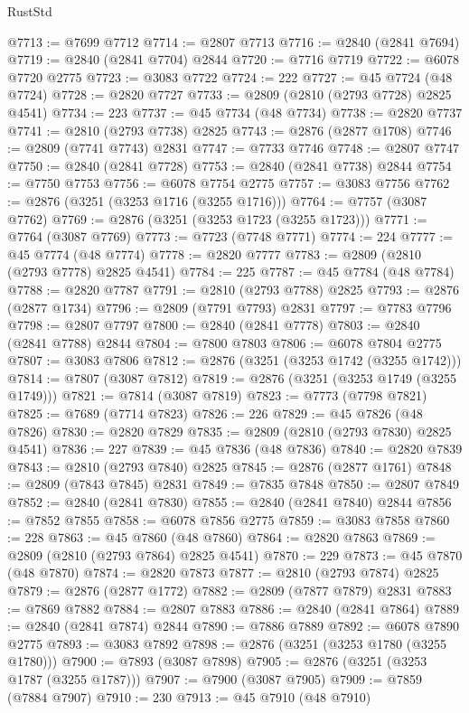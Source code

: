 \begin{lexlean}{RustStd}
\begin{coremodule}
@7713 := @7699 @7712
@7714 := @2807 @7713
@7716 := @2840 (@2841 @7694)
@7719 := @2840 (@2841 @7704) @2844
@7720 := @7716 @7719
@7722 := @6078 @7720 @2775
@7723 := @3083 @7722
@7724 := 222
@7727 := @45 @7724 (@48 @7724)
@7728 := @2820 @7727
@7733 := @2809 (@2810 (@2793 @7728) @2825 @4541)
@7734 := 223
@7737 := @45 @7734 (@48 @7734)
@7738 := @2820 @7737
@7741 := @2810 (@2793 @7738) @2825
@7743 := @2876 (@2877 @1708)
@7746 := @2809 (@7741 @7743) @2831
@7747 := @7733 @7746
@7748 := @2807 @7747
@7750 := @2840 (@2841 @7728)
@7753 := @2840 (@2841 @7738) @2844
@7754 := @7750 @7753
@7756 := @6078 @7754 @2775
@7757 := @3083 @7756
@7762 := @2876 (@3251 (@3253 @1716 (@3255 @1716)))
@7764 := @7757 (@3087 @7762)
@7769 := @2876 (@3251 (@3253 @1723 (@3255 @1723)))
@7771 := @7764 (@3087 @7769)
@7773 := @7723 (@7748 @7771)
@7774 := 224
@7777 := @45 @7774 (@48 @7774)
@7778 := @2820 @7777
@7783 := @2809 (@2810 (@2793 @7778) @2825 @4541)
@7784 := 225
@7787 := @45 @7784 (@48 @7784)
@7788 := @2820 @7787
@7791 := @2810 (@2793 @7788) @2825
@7793 := @2876 (@2877 @1734)
@7796 := @2809 (@7791 @7793) @2831
@7797 := @7783 @7796
@7798 := @2807 @7797
@7800 := @2840 (@2841 @7778)
@7803 := @2840 (@2841 @7788) @2844
@7804 := @7800 @7803
@7806 := @6078 @7804 @2775
@7807 := @3083 @7806
@7812 := @2876 (@3251 (@3253 @1742 (@3255 @1742)))
@7814 := @7807 (@3087 @7812)
@7819 := @2876 (@3251 (@3253 @1749 (@3255 @1749)))
@7821 := @7814 (@3087 @7819)
@7823 := @7773 (@7798 @7821)
@7825 := @7689 (@7714 @7823)
@7826 := 226
@7829 := @45 @7826 (@48 @7826)
@7830 := @2820 @7829
@7835 := @2809 (@2810 (@2793 @7830) @2825 @4541)
@7836 := 227
@7839 := @45 @7836 (@48 @7836)
@7840 := @2820 @7839
@7843 := @2810 (@2793 @7840) @2825
@7845 := @2876 (@2877 @1761)
@7848 := @2809 (@7843 @7845) @2831
@7849 := @7835 @7848
@7850 := @2807 @7849
@7852 := @2840 (@2841 @7830)
@7855 := @2840 (@2841 @7840) @2844
@7856 := @7852 @7855
@7858 := @6078 @7856 @2775
@7859 := @3083 @7858
@7860 := 228
@7863 := @45 @7860 (@48 @7860)
@7864 := @2820 @7863
@7869 := @2809 (@2810 (@2793 @7864) @2825 @4541)
@7870 := 229
@7873 := @45 @7870 (@48 @7870)
@7874 := @2820 @7873
@7877 := @2810 (@2793 @7874) @2825
@7879 := @2876 (@2877 @1772)
@7882 := @2809 (@7877 @7879) @2831
@7883 := @7869 @7882
@7884 := @2807 @7883
@7886 := @2840 (@2841 @7864)
@7889 := @2840 (@2841 @7874) @2844
@7890 := @7886 @7889
@7892 := @6078 @7890 @2775
@7893 := @3083 @7892
@7898 := @2876 (@3251 (@3253 @1780 (@3255 @1780)))
@7900 := @7893 (@3087 @7898)
@7905 := @2876 (@3251 (@3253 @1787 (@3255 @1787)))
@7907 := @7900 (@3087 @7905)
@7909 := @7859 (@7884 @7907)
@7910 := 230
@7913 := @45 @7910 (@48 @7910)

\end{coremodule}
\end{lexlean}
